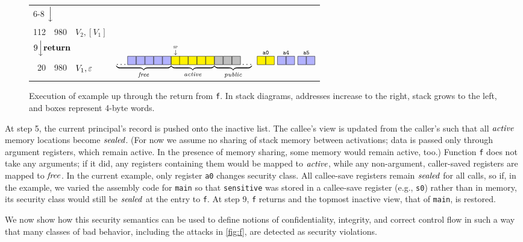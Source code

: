 \documentclass[10pt,conference]{ieeetran}%
\theoremstyle{definition}
\begin{document}
\begin{figure*}
\begin{tabular}{|r|r||l|r}
    \cline{1-3}
    \multicolumn{3}{l}{\multirow{2}{*}{6-8 \(\Big\downarrow\)}} \\ \multicolumn{3}{l}{} \\
    \cline{1-3}
    112 & 980 & \(V_2,[V_1]\) \\
    \cline{1-3}
    \multicolumn{3}{l}{\multirow{2}{*}{\(9 \Big\downarrow \mathbf{return}\)}} & \\
    \multicolumn{3}{l}{} & \multirow{3}{*}{\(\underbrace{\dots \freebox \freebox \freebox \freebox \freebox}_\unsealed
      \! \underbrace{\stackrel{\stackrel{\SP}{\downarrow}}{\objbox} \!\! \objbox \objbox \objbox \objbox}_\object
      \! \underbrace{\pubbox \pubbox \pubbox \dots}_\public
      ~ \stackrel{\mathtt{a0}}{\objbox\objbox} ~ \stackrel{\mathtt{a4}}{\freebox\freebox}
      ~ \stackrel{\mathtt{a5}}{\freebox\freebox}
      \)}
    \\
    \cline{1-3}
    20 & 980  & \(V_1, \varepsilon\) &
    \\
    \cline{1-3}
    \multicolumn{2}{l}{} \\
  \end{tabular}
  \caption{Execution of example up through the return from {\tt f}. In stack diagrams, addresses increase to the right, stack grows to the left, and boxes represent 4-byte words.}
\label{fig:exec1}
\end{figure*}
%
At step 5, the current principal's record is pushed onto the inactive list.
The callee's view is updated from the caller's such that all \(\mathit{active}\) memory locations
become \(\mathit{sealed}\). (For now we assume no sharing of stack memory between activations; data is
passed only through argument registers, which remain active. In the presence of memory
sharing, some memory would remain active, too.)
Function {\tt f} does not take any arguments; if it did, any registers containing them would be
mapped to \(\mathit{active}\), while any non-argument, caller-saved
registers are mapped to \(\mathit{free}\). In the current example, only register {\tt a0}  changes
security class. All callee-save registers remain \(\mathit{sealed}\) for all calls, so
if, in the example, we varied the assembly code for {\tt main} so that {\tt sensitive} was stored
in a callee-save register (e.g., {\tt s0}) rather than in memory, its security class would still
be \(\mathit{sealed}\) at the entry to {\tt f}.
%
At step 9, {\tt f} returns and the topmost inactive view, that of {\tt main}, is restored.

We now show how this security semantics can be used to define notions of confidentiality,
integrity, and correct control flow in such a way that many classes of
bad behavior, including the attacks in \cref{fig:f}, are
detected as security violations.
\end{document}
